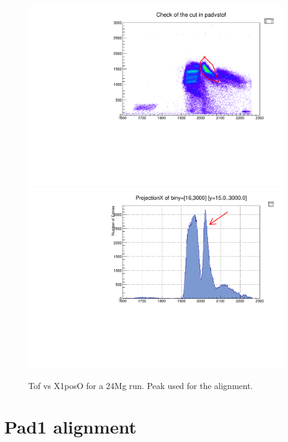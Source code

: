 \documentclass[]{report}
\begin{document}
\begin{figure}
	\includegraphics[width=\linewidth]{Figure/run2227-24Mg-TOFaligment-Jan18.pdf}
	\includegraphics[width=\linewidth]{Figure/run2227-24Mg-TOFaligment-peak-Jan18.pdf}
	\caption{Tof vs X1posO for a 24Mg run. Peak used for the alignment.}
	\label{fig:tofvspad1}
\end{figure}

\section{Pad1 alignment}
\end{document}
